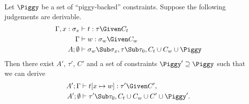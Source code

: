 \documentclass{amsart}
\theoremstyle{definition}
\begin{document}
Let $\Piggy$ be a set of ``piggy-backed'' constraints. Suppose
the following judgements are derivable.
\begin{align}
\Gamma,x:\sigma_x&\vdash t:\tau\Given C_t \notag
\\
\Gamma&\vdash \Xdef:\sigma_\Xdef \Given C_\Xdef \notag
\\
A;\Exigent&\vdash
\sigma_\Xdef\Sub\sigma_x, \tau\Sub\tau_0,C_t\cup C_\Xdef\cup\Piggy
\label{eq:subass}
\end{align}
Then there exist $A'$, $\tau'$, $C'$ and a set of constraints
$\Piggy'\supseteq\Piggy$ such that we can derive
\begin{align*}
A';\Gamma&\vdash t[x\mapsto \Xdef] : \tau'\Given C',\\
A';\Exigent &\vdash \tau'\Sub\tau_0, C_t\cup C_\Xdef\cup C'\cup\Piggy'.
\end{align*}
\end{document}
